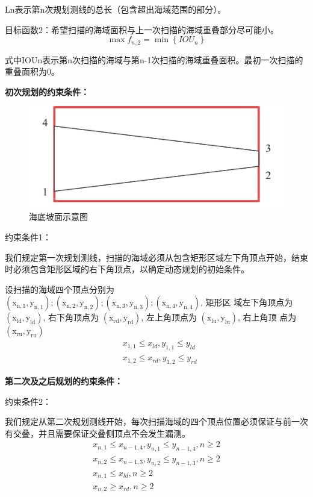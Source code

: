 \documentclass[12pt,a4paper]{article}
\begin{document}
	Ln表示第n次规划测线的总长（包含超出海域范围的部分）。
	
	目标函数2：希望扫描的海域面积与上一次扫描的海域重叠部分尽可能小。
	$$
	\max f_{n, 2}=\min \left\{I O U_n\right\}
	$$
	
	式中IOUn表示第n次扫描的海域与第n-1次扫描的海域重叠面积。最初一次扫描的重叠面积为0。
	
	\textbf{初次规划的约束条件：}
	\begin{figure}[H]
		\centering
		\includegraphics[width=0.75\linewidth]{media/image44}
		\caption{海底坡面示意图}
		\label{fig4}
	\end{figure}
	
	约束条件1：
	
	我们规定第一次规划测线，扫描的海域必须从包含矩形区域左下角顶点开始，结束时必须包含矩形区域的右下角顶点，以确定动态规划的初始条件。
	
	设扫描的海域四个顶点分别为 $\left(\mathrm{x}_{\mathrm{n}, 1}, \mathrm{y}_{\mathrm{n}, 1}\right) ;\left(\mathrm{x}_{\mathrm{n}, 2}, \mathrm{y}_{\mathrm{n}, 2}\right) ;\left(\mathrm{x}_{\mathrm{n}, 3}, \mathrm{y}_{\mathrm{n}, 3}\right) ;\left(\mathrm{x}_{\mathrm{n}, 4}, \mathrm{y}_{\mathrm{n}, 4}\right)$, 矩形区 域左下角顶点为 $\left(\mathrm{x}_{\mathrm{ld}}, \mathrm{y}_{\mathrm{ld}}\right)$, 右下角顶点为 $\left(\mathrm{x}_{\mathrm{rd}}, \mathrm{y}_{\mathrm{rd}}\right)$, 左上角顶点为 $\left(\mathrm{x}_{\mathrm{lu}}, \mathrm{y}_{\mathrm{lu}}\right)$, 右上角顶 点为 $\left(\mathrm{x}_{\mathrm{ru}}, \mathrm{y}_{\mathrm{ru}}\right)$
	$$
	\begin{aligned}
		& x_{1,1} \leq x_{l d}, y_{1,1} \leq y_{l d} \\
		& x_{1,2} \leq x_{r d}, y_{1,2} \leq y_{r d}
	\end{aligned}
	$$
	
	\textbf{第二次及之后规划的约束条件：}
	
	约束条件2：
	
	我们规定从第二次规划测线开始，每次扫描海域的四个顶点位置必须保证与前一次有交叠，并且需要保证交叠侧顶点不会发生漏测。
	$$
	\begin{gathered}
		x_{n, 1} \leq x_{n-1,4}, y_{n, 1} \leq y_{n-1,4}, n \geq 2 \\
		x_{n, 2} \leq x_{n-1,3}, y_{n, 2} \leq y_{n-1,3}, n \geq 2 \\
		x_{n, 1} \leq x_{l d}, n \geq 2 \\
		x_{n, 2} \geq x_{r d}, n \geq 2
	\end{gathered}
	$$
	
\end{document}
